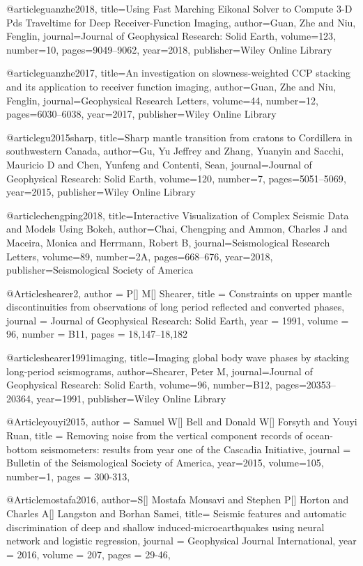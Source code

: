 @article{guanzhe2018,
  title={Using Fast Marching Eikonal Solver to Compute 3-D Pds Traveltime for Deep Receiver-Function Imaging},
  author={Guan, Zhe and Niu, Fenglin},
  journal={Journal of Geophysical Research: Solid Earth},
  volume={123},
  number={10},
  pages={9049--9062},
  year={2018},
  publisher={Wiley Online Library}
}

@article{guanzhe2017,
  title={An investigation on slowness-weighted CCP stacking and its application to receiver function imaging},
  author={Guan, Zhe and Niu, Fenglin},
  journal={Geophysical Research Letters},
  volume={44},
  number={12},
  pages={6030--6038},
  year={2017},
  publisher={Wiley Online Library}
}

@article{gu2015sharp,
  title={Sharp mantle transition from cratons to Cordillera in southwestern Canada},
  author={Gu, Yu Jeffrey and Zhang, Yuanyin and Sacchi, Mauricio D and Chen, Yunfeng and Contenti, Sean},
  journal={Journal of Geophysical Research: Solid Earth},
  volume={120},
  number={7},
  pages={5051--5069},
  year={2015},
  publisher={Wiley Online Library}
}

@article{chengping2018,
  title={Interactive Visualization of Complex Seismic Data and Models Using Bokeh},
  author={Chai, Chengping and Ammon, Charles J and Maceira, Monica and Herrmann, Robert B},
  journal={Seismological Research Letters},
  volume={89},
  number={2A},
  pages={668--676},
  year={2018},
  publisher={Seismological Society of America}
}



@Article{shearer2,
  author = 	 {P[] M[] Shearer},
  title = 	 {Constraints on upper mantle discontinuities from observations
	of long period reflected and converted phases},
  journal = 	 {Journal of Geophysical Research: Solid Earth},
  year = 	 1991,
  volume = 	 96,
  number = 	 {B11},
  pages = 	 {18,147--18,182}}
  
@article{shearer1991imaging,
  title={Imaging global body wave phases by stacking long-period seismograms},
  author={Shearer, Peter M},
  journal={Journal of Geophysical Research: Solid Earth},
  volume={96},
  number={B12},
  pages={20353--20364},
  year={1991},
  publisher={Wiley Online Library}
}


@Article{youyi2015,
  author =	 {Samuel W[] Bell and Donald W[] Forsyth and Youyi Ruan},
  title =	 {Removing noise from the vertical component records of ocean-bottom seismometers: results from year one of the Cascadia Initiative},
  journal =	 {Bulletin of the Seismological Society of America},
  year=2015,
  volume=105,
  number=1,
  pages =	 {300-313},
}


@Article{mostafa2016,
  author={S[] Mostafa Mousavi and Stephen P[] Horton and Charles A[] Langston and Borhan Samei},
  title={ Seismic features and automatic discrimination of deep and shallow induced-microearthquakes using neural network and logistic regression},
  journal = 	 {Geophysical Journal International},
  year = 	 2016,
  volume =	 207,
  pages =	 {29-46},
}





